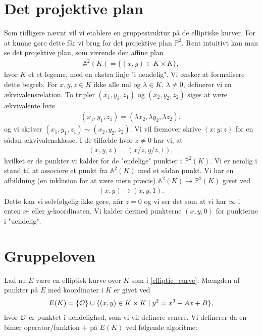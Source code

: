 \section{Det projektive plan}
Som tidligere nævnt vil vi etablere en gruppestruktur på de elliptiske
kurver. For at kunne gøre dette får vi brug for det projektive plan 
$\mathbb{P}^2$. Rent intuitivt kan man se det projektive plan, som
værende den affine plan 
\begin{align*}
	\mathbb{A}^2(K) = \{ (x, y) \in K \times K \},
\end{align*}
hvor $K$ et et legeme, med en ekstra linje "i uendelig". 
Vi ønsker at formalisere dette begreb. 
For $x, y, z \in K$ ikke alle nul og $\lambda \in K$, $\lambda \neq 0$, 
definerer vi en ækvivalensrelation. To tripler $(x_1, y_1, z_1)$ og 
$(x_2, y_2, z_2)$ siges at være ækvivalente hvis 
\begin{align*}
	(x_1, y_1, z_1) = (\lambda x_2, \lambda y_2, \lambda z_2),
\end{align*}
og vi skriver $(x_1, y_1, z_1) \sim (x_2, y_2, z_2)$. Vi vil fremover skrive
$(x:y:z)$ for en sådan ækvivalensklasse. I de tilfælde hvor $z \neq 0$ har vi, at
\begin{align*}
	(x, y, z) = (x/z, y/z, 1),
\end{align*}
hvilket er de punkter vi kalder for de "endelige" punkter i $\mathbb{P}^2(K)$.
Vi er nemlig i stand til at associere et punkt fra $\mathbb{A}^2(K)$ med et sådan
punkt. Vi har en afbildning (en inklusion for at være mere præcis) 
$\mathbb{A}^2(K) \to \mathbb{P}^2(K)$ givet ved
\begin{align*}
	(x, y) \mapsto (x, y, 1).
\end{align*}
Dette kan vi selvfølgelig ikke gøre, når $z=0$ og vi ser det som at vi
har $\infty$ i enten $x$- eller $y$-koordinaten. Vi kalder dermed punkterne
$(x, y, 0)$ for punkterne i "uendelig".








\section{Gruppeloven}
Lad nu $E$ være en elliptisk kurve over $K$ som i \ref{elliptic_curve}. Mængden
af punkter på $E$ med koordinater i $K$ er givet ved
\begin{align*}
	E(K) = \{ \mathcal{O} \} \cup \{ (x, y) \in K \times K \mid y^2 = x^3 + Ax + B \},
\end{align*}
hvor $\mathcal{O}$ er punktet i uendelighed, som vi vil definere senere. Vi definerer
da en binær operator/funktion $+$ på $E(K)$ ved følgende algoritme:

